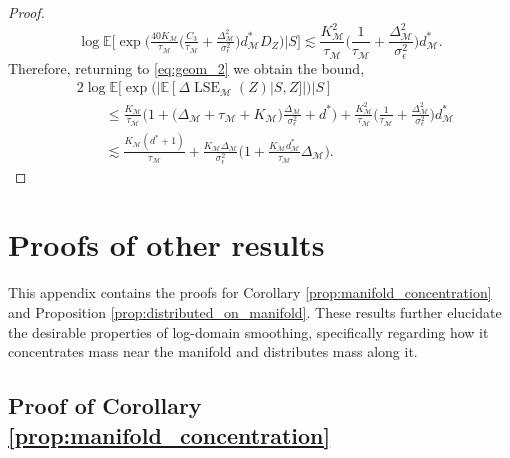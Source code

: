 \documentclass[10pt]{article}
\theoremstyle{plain}
\theoremstyle{definition}
\theoremstyle{remark}
\newcommand{\M}{{\mathcal{M}}}
\newcommand{\lse}{\operatorname{LSE}}
\newcommand{\E}{\mathbb{E}}
\newcommand{\gap}{\Delta_\M}
\begin{document}
\begin{proof}
\begin{equation*}
    \log \E \bigg [ \exp \bigg ( \tfrac{40 K_\M}{\tau_\M} \Big ( \tfrac{C_3}{\tau_\M} + \tfrac{\gap^2}{\sigma^2_\epsilon} \Big ) d_\M^* D_Z \bigg ) \bigg | S \bigg ] \lesssim \frac{K_\M^2}{\tau_\M} \bigg ( \frac{1}{\tau_\M} + \frac{\gap^2}{\sigma^2_\epsilon} \bigg ) d_\M^*.
\end{equation*}
Therefore, returning to \eqref{eq:geom_2} we obtain the bound,
\begin{align*}
    &2\log \E[\exp ( | \E[\Delta \lse_\M(Z)|S, Z] |) | S] \\
    & \qquad \leq \frac{K_\M}{\tau_\M} \bigg ( 1 + \Big (\gap + \tau_\M + K_\M\Big ) \frac{\gap}{\sigma_\epsilon^2} + d^* \bigg ) + \frac{K_\M^2}{\tau_\M} \bigg ( \frac{1}{\tau_\M} + \frac{\gap^2}{\sigma^2_\epsilon} \bigg ) d_\M^*\\
    & \qquad \lesssim \frac{K_\M (d^*+1)}{\tau_\M} + \frac{K_\M \gap}{\sigma_\epsilon^2} \bigg (1 + \frac{K_\M d^*_\M}{\tau_\M} \gap \bigg ).
\end{align*}
\end{proof}

\section{Proofs of other results}
This appendix contains the proofs for Corollary \ref{prop:manifold_concentration} and Proposition \ref{prop:distributed_on_manifold}. These results further elucidate the desirable properties of log-domain smoothing, specifically regarding how it concentrates mass near the manifold and distributes mass along it.

\subsection{Proof of Corollary \ref{prop:manifold_concentration}}
\end{document}
